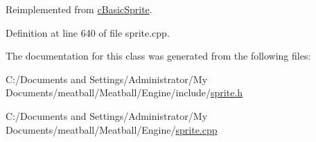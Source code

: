 Reimplemented from \hyperlink{classc_basic_sprite_a6f01984a6af849dc95cc9ec1f3528074}{c\-Basic\-Sprite}.



Definition at line 640 of file sprite.\-cpp.



The documentation for this class was generated from the following files\-:\begin{DoxyCompactItemize}
\item 
C\-:/\-Documents and Settings/\-Administrator/\-My Documents/meatball/\-Meatball/\-Engine/include/\hyperlink{_engine_2include_2sprite_8h}{sprite.\-h}\item 
C\-:/\-Documents and Settings/\-Administrator/\-My Documents/meatball/\-Meatball/\-Engine/\hyperlink{_engine_2sprite_8cpp}{sprite.\-cpp}\end{DoxyCompactItemize}
